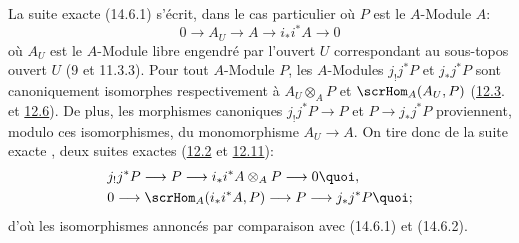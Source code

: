 \documentclass[10pt]{../fichiers-configuration-latex/smfart}
\begin{document}
La suite exacte (14.6.1) s'écrit, dans le cas particulier où
$P$ est le $A$-Module $A$:
\begin{equation*}
0\longrightarrow A_U\longrightarrow A\longrightarrow
i_{\ast}i^{\ast}A\longrightarrow 0\tag{14.10.1}
\end{equation*}
où $A_U$ est le $A$-Module libre engendré par l'ouvert $U$
correspondant au sous-topos ouvert $U$ (9 et 11.3.3). Pour tout
$A$-Module $P$, les $A$-Modules $j_{!}j^{\ast}P$ et
$j_{\ast}j^{\ast}P$ sont canoniquement isomorphes respectivement à
$A_U\otimes_A P$ et $\scrHom_A(A_{U}, P)$ (\hyperref[IV.prop12.3]{12.3}. et
\hyperref[IV.cor12.6]{12.6}). De plus, les morphismes canoniques
$j_{!}j^{\ast}P\rightarrow P$ et $P\rightarrow j_{\ast}j^{\ast}P$
proviennent, modulo ces isomorphismes, du monomorphisme
$A_U\rightarrow A$. On tire donc de la suite exacte , deux
suites exactes (\hyperref[IV.subsec12.2]{12.2} et \hyperref[IV.prop12.11]{12.11}):
\begin{align*}
& j_{!}j^{\ast}P\longrightarrow P\longrightarrow
i_{\ast}i^{\ast}A\otimes_AP\longrightarrow 0{\quoi},\\
& 0\longrightarrow \scrHom_A(i_{\ast}i^{\ast}A, P)\longrightarrow
P\longrightarrow j_{\ast} j^{\ast}P{\quoi};
\end{align*}
d'où les isomorphismes annoncés par comparaison avec (14.6.1)
et (14.6.2).
\end{document}
